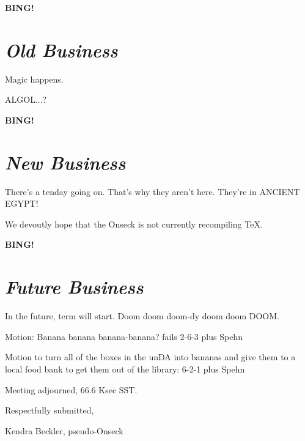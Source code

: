 \documentclass[10pt]{article}
\newcommand{\bing}{{\bf BING!} }
\newcommand{\goto}[1]{\bing \vskip 12pt \section*{{\em{#1}}}}
\newcommand{\ps}{ plus Spehn\xspace}
\begin{document}
\goto{Old Business}

Magic happens.

ALGOL...?

\goto{New Business}

There's a tenday going on.  That's why they aren't here.  They're in ANCIENT EGYPT!

We devoutly hope that the Onseck is not currently recompiling TeX.

\goto{Future Business}

In the future, term will start.  Doom doom doom-dy doom doom DOOM.

Motion: Banana banana banana-banana? fails 2-6-3 \ps

Motion to turn all of the boxes in the unDA into bananas and give them to a local food bank to get them out of the library: 6-2-1 \ps

\noindent
Meeting adjourned, 66.6 Ksec SST.

\vspace{18pt}

\centerline{Respectfully submitted,}
\centerline{Kendra Beckler, pseudo-Onseck}
\end{document}
